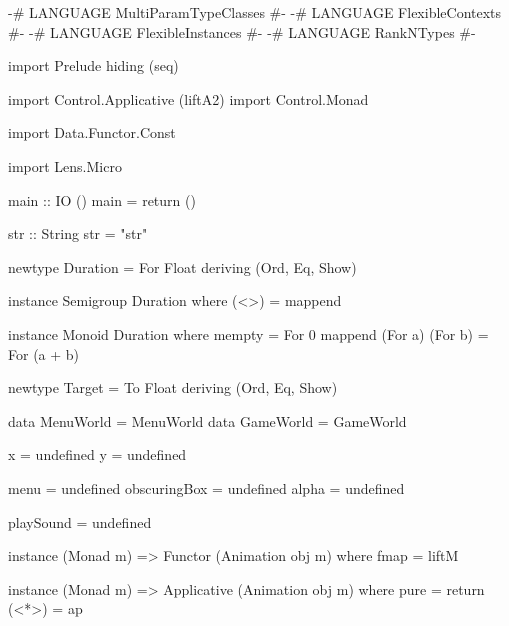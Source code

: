 \begin{code}
{-# LANGUAGE MultiParamTypeClasses #-}
{-# LANGUAGE FlexibleContexts #-}
{-# LANGUAGE FlexibleInstances #-}
{-# LANGUAGE RankNTypes #-}

import Prelude hiding (seq)

import Control.Applicative (liftA2)
import Control.Monad

import Data.Functor.Const

import Lens.Micro

main :: IO ()
main = return ()

str :: String
str = "str"

newtype Duration = For Float
  deriving (Ord, Eq, Show)

instance Semigroup Duration where
  (<>) = mappend

instance Monoid Duration where
  mempty = For 0
  mappend (For a) (For b) = For (a + b)

newtype Target = To Float
  deriving (Ord, Eq, Show)

data MenuWorld = MenuWorld
data GameWorld = GameWorld

x = undefined
y = undefined

menu = undefined
obscuringBox = undefined
alpha = undefined

playSound = undefined

instance (Monad m) => Functor (Animation obj m) where
  fmap = liftM

instance (Monad m) => Applicative (Animation obj m) where
  pure = return
  (<*>) = ap
\end{code}
